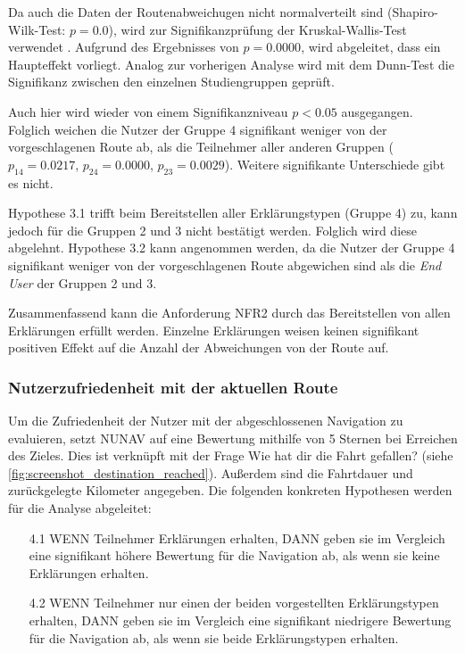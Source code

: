 Da auch die Daten der Routenabweichugen nicht normalverteilt sind (Shapiro-Wilk-Test: $ p = 0.0 $), wird zur Signifikanzprüfung der Kruskal-Wallis-Test verwendet \cite{wohlin2012experimentation}. Aufgrund des Ergebnisses von $ p = 0.0000 $, wird abgeleitet, dass ein Haupteffekt vorliegt. Analog zur vorherigen Analyse wird mit dem Dunn-Test die Signifikanz zwischen den einzelnen Studiengruppen geprüft. 

Auch hier wird wieder von einem Signifikanzniveau $ p < 0.05 $ ausgegangen. Folglich weichen die Nutzer der Gruppe 4 signifikant weniger von der vorgeschlagenen Route ab, als die Teilnehmer aller anderen Gruppen ($ p_{14} = 0.0217 $, $ p_{24} = 0.0000 $, $ p_{23} = 0.0029 $). Weitere signifikante Unterschiede gibt es nicht.

Hypothese 3.1 trifft beim Bereitstellen aller Erklärungstypen (Gruppe 4) zu, kann jedoch für die Gruppen 2 und 3 nicht bestätigt werden. Folglich wird diese abgelehnt. Hypothese 3.2 kann angenommen werden, da die Nutzer der Gruppe 4 signifikant weniger von der vorgeschlagenen Route abgewichen sind als die \textit{End User} der Gruppen 2 und 3.

Zusammenfassend kann die Anforderung NFR2 durch das Bereitstellen von allen Erklärungen erfüllt werden. Einzelne Erklärungen weisen keinen signifikant positiven Effekt auf die Anzahl der Abweichungen von der Route auf. 

\subsubsection{Nutzerzufriedenheit mit der aktuellen Route}

Um die Zufriedenheit der Nutzer mit der abgeschlossenen Navigation zu evaluieren, setzt NUNAV auf eine Bewertung mithilfe von 5 Sternen bei Erreichen des Zieles. Dies ist verknüpft mit der Frage \glqq Wie hat dir die Fahrt gefallen?\grqq{} (siehe \autoref{fig:screenshot_destination_reached}). Außerdem sind die Fahrtdauer und zurückgelegte Kilometer angegeben. Die folgenden konkreten Hypothesen werden für die Analyse abgeleitet:

\begin{enumerate}
    \item[4.1] WENN Teilnehmer Erklärungen erhalten, DANN geben sie im Vergleich eine signifikant höhere Bewertung für die Navigation ab, als wenn sie keine Erklärungen erhalten.
    \item[4.2] WENN Teilnehmer nur einen der beiden vorgestellten Erklärungstypen erhalten, DANN geben sie im Vergleich eine signifikant niedrigere Bewertung für die Navigation ab, als wenn sie beide Erklärungstypen erhalten.
\end{enumerate}

